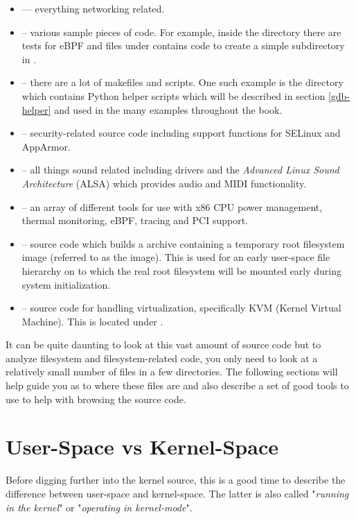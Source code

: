 \begin{itemize}
	\item {} --- everything networking related. 
	\item {} -- various sample pieces of code. For example, inside the  directory there are tests for eBPF and
		files under  contains code to create a simple subdirectory in . 
	\item {} -- there are a lot of makefiles and scripts. One such example is the directory  
		which contains Python helper scripts which will be described in section \ref{gdb-helper} and used in the many
		 examples  throughout the book.
	\item {} -- security-related source code including support functions for SELinux and
		AppArmor. 
	\item {} -- all things sound related including drivers and the \textit{Advanced Linux Sound 
		Architecture} (ALSA) which provides audio and MIDI functionality.
	\item {} -- an array of different tools for use with x86 CPU power management, thermal monitoring, eBPF, tracing
		and PCI support.
	\item {} -- source code which builds a  archive containing a temporary root filesystem image 
		(referred to as the  image). This is used for an early user-space file hierarchy on to which the real
		root filesystem will be mounted early during system initialization.
	\item {} --  source code for handling virtualization, specifically KVM (Kernel Virtual Machine). This is located 
		under .
\end{itemize}

\noindent
It can be quite daunting to look at this vast amount of source code but to analyze filesystem and filesystem-related code, you only need to look at a relatively small number of files in a few directories. The following sections will help guide you as to where these files are and also describe a set of good tools to use to help with browsing the source code.

\section{User-Space vs Kernel-Space}

Before digging further into the kernel source, this is a good time to describe the difference between user-space and kernel-space. The latter is also called "\textit{running in the kernel}" or "\textit{operating in kernel-mode}".

